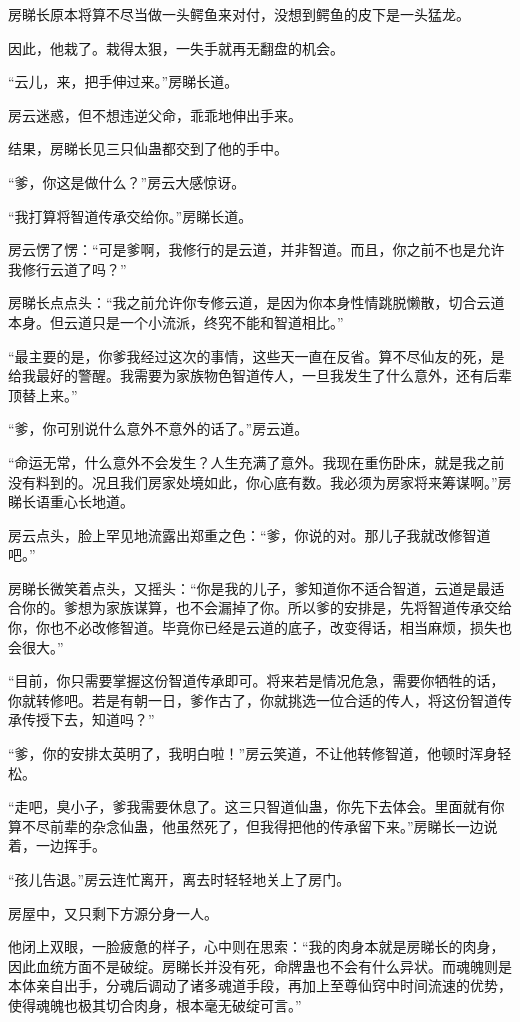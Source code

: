 \begin{this_body}
房睇长原本将算不尽当做一头鳄鱼来对付，没想到鳄鱼的皮下是一头猛龙。

因此，他栽了。栽得太狠，一失手就再无翻盘的机会。

“云儿，来，把手伸过来。”房睇长道。

房云迷惑，但不想违逆父命，乖乖地伸出手来。

结果，房睇长见三只仙蛊都交到了他的手中。

“爹，你这是做什么？”房云大感惊讶。

“我打算将智道传承交给你。”房睇长道。

房云愣了愣：“可是爹啊，我修行的是云道，并非智道。而且，你之前不也是允许我修行云道了吗？”

房睇长点点头：“我之前允许你专修云道，是因为你本身性情跳脱懒散，切合云道本身。但云道只是一个小流派，终究不能和智道相比。”

“最主要的是，你爹我经过这次的事情，这些天一直在反省。算不尽仙友的死，是给我最好的警醒。我需要为家族物色智道传人，一旦我发生了什么意外，还有后辈顶替上来。”

“爹，你可别说什么意外不意外的话了。”房云道。

“命运无常，什么意外不会发生？人生充满了意外。我现在重伤卧床，就是我之前没有料到的。况且我们房家处境如此，你心底有数。我必须为房家将来筹谋啊。”房睇长语重心长地道。

房云点头，脸上罕见地流露出郑重之色：“爹，你说的对。那儿子我就改修智道吧。”

房睇长微笑着点头，又摇头：“你是我的儿子，爹知道你不适合智道，云道是最适合你的。爹想为家族谋算，也不会漏掉了你。所以爹的安排是，先将智道传承交给你，你也不必改修智道。毕竟你已经是云道的底子，改变得话，相当麻烦，损失也会很大。”

“目前，你只需要掌握这份智道传承即可。将来若是情况危急，需要你牺牲的话，你就转修吧。若是有朝一日，爹作古了，你就挑选一位合适的传人，将这份智道传承传授下去，知道吗？”

“爹，你的安排太英明了，我明白啦！”房云笑道，不让他转修智道，他顿时浑身轻松。

“走吧，臭小子，爹我需要休息了。这三只智道仙蛊，你先下去体会。里面就有你算不尽前辈的杂念仙蛊，他虽然死了，但我得把他的传承留下来。”房睇长一边说着，一边挥手。

“孩儿告退。”房云连忙离开，离去时轻轻地关上了房门。

房屋中，又只剩下方源分身一人。

他闭上双眼，一脸疲惫的样子，心中则在思索：“我的肉身本就是房睇长的肉身，因此血统方面不是破绽。房睇长并没有死，命牌蛊也不会有什么异状。而魂魄则是本体亲自出手，分魂后调动了诸多魂道手段，再加上至尊仙窍中时间流速的优势，使得魂魄也极其切合肉身，根本毫无破绽可言。”


\end{this_body}
